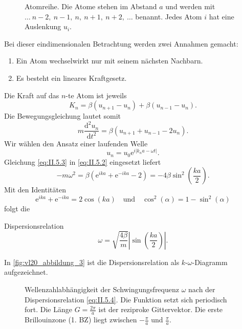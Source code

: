 	\begin{figure}[H]
		\centering
		\caption{Atomreihe. Die Atome stehen im Abstand $a$ und werden mit $\ldots~{n-2,}~{n-1,}~{n,}~{n+1,}~{n+2,~\ldots}$ benannt. Jedes Atom $i$ hat eine Auslenkung $u_i$.}
		\label{fig:vl20_abbildung_2}
	\end{figure}
	Bei dieser eindimensionalen Betrachtung werden zwei Annahmen gemacht:
	\begin{enumerate}
		\item Ein Atom wechselwirkt nur mit seinem nächsten Nachbarn.
		\item Es besteht ein lineares Kraftgesetz.
	\end{enumerate}

	Die Kraft auf das $n$-te Atom ist jeweils
	\begin{equation}
		\label{eq:II.5.1}
		K_{n} = \beta \left( u_{n+1} - u_{n} \right) + \beta\left( u_{n-1}-u_{n} \right).
	\end{equation}
	Die Bewegungsgleichung lautet somit
	\begin{equation}
		\label{eq:II.5.2}
		m \frac{\mathrm{d}^2 u_{n}}{\mathrm{d}t^2} = \beta \left( u_{n+1} + u_{n-1} - 2 u_{n} \right).
	\end{equation}
	Wir wählen den Ansatz einer laufenden Welle
	\begin{equation}
		\label{eq:II.5.3}
		u_{n} = u_0 \mathrm e^{i \left| k_{n} a - \omega t \right| }.
	\end{equation}
	Gleichung \eqref{eq:II.5.3} in \eqref{eq:II.5.2} eingesetzt liefert
	$$
	- m\omega^2 = \beta\left(\mathrm e^{ika} + \mathrm e^{-ika} - 2 \right) = - 4\beta \sin^2\left( \frac{ka}{2} \right) .
	$$
	Mit den Identitäten
	$$
		\mathrm e^{ika}+\mathrm e^{-ika} = 2\cos(ka) \quad\text{und}\quad \cos^2 (\alpha) = 1 - \sin^2(\alpha)
	$$
	folgt die 
	\begin{important}
		Dispersionsrelation 
		\begin{equation}
			\label{eq:II.5.4}
			\omega = \sqrt{ \frac{4 \beta}{m}} \left| \sin\left( \frac{ka}{2} \right)  \right| . 
		\end{equation}
	\end{important}
	In \autoref{fig:vl20_abbildung_3} ist die Dispersionsrelation als $k$-$\omega$-Diagramm aufgezeichnet.
	\begin{figure}[H]
		\centering
		\caption{Wellenzahlabhängigkeit der Schwingungsfrequenz $\omega$ nach der Dispersionsrelation \eqref{eq:II.5.4}.
			Die Funktion setzt sich periodisch fort.
			Die Länge $G=\frac{2\pi}{a}$ ist der reziproke Gittervektor.
			Die erste Brillouinzone (1. BZ) liegt zwischen $-\frac\pi a$ und $\frac\pi a$.	
		}
		\label{fig:vl20_abbildung_3}
	\end{figure}
